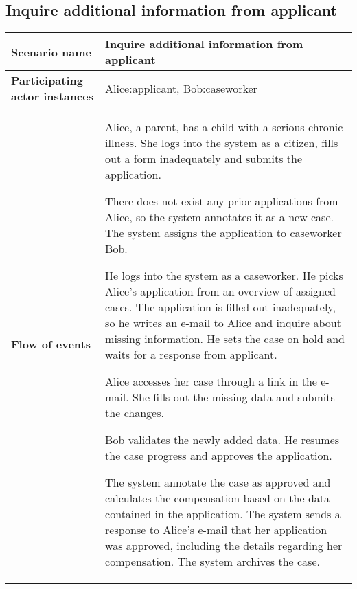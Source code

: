 \subsection*{Inquire additional information from applicant}
\begin{table}[htb!]
\begin{tabularx}{\textwidth}{l|X}
	\textbf{Scenario name} & Inquire additional information from applicant \\
	\hline
	\textbf{Participating actor instances} & Alice:applicant, Bob:caseworker\\
	\hline
	\textbf{Flow of events} &
	\begin{compactenum}
	        \item Alice, a parent, has a child with a serious chronic illness. She logs into the system as a citizen, fills out a form inadequately and submits the application.
	        \item There does not exist any prior applications from Alice, so the system annotates it as a new case. The system assigns the application to caseworker Bob.
	        \item He logs into the system as a caseworker. He picks Alice's application from an overview of assigned cases. The application is filled out inadequately, so he writes an e-mail to Alice and inquire about missing information. He sets the case on hold and waits for a response from applicant.
	        \item Alice accesses her case through a link in the e-mail. She fills out the missing data and submits the changes.
	        \item Bob validates the newly added data. He resumes the case progress and approves the application.
	        \item The system annotate the case as approved and calculates the compensation based on the data contained in the application. The system sends a response to Alice's e-mail that her application was approved, including the details regarding her compensation. The system archives the case.
	\end{compactenum}\\
	\hline
\end{tabularx}
\end{table}

